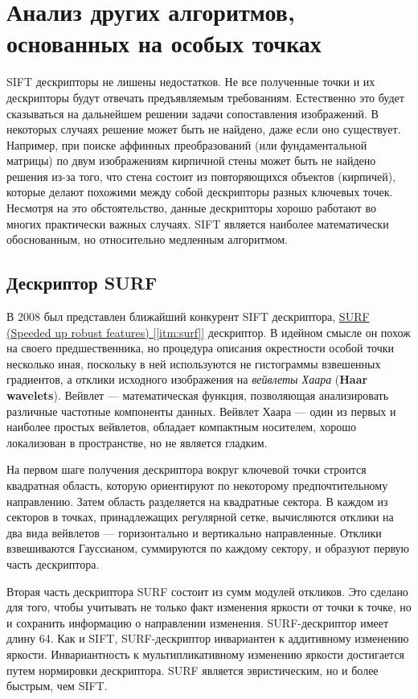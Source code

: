 \section{Анализ других алгоритмов, основанных на особых точках}

SIFT дескрипторы не лишены недостатков. Не все полученные точки и их дескрипторы будут отвечать предъявляемым требованиям. Естественно это будет сказываться на дальнейшем решении задачи сопоставления изображений. В некоторых случаях решение может быть не найдено, даже если оно существует. Например, при поиске аффинных преобразований (или фундаментальной матрицы) по двум изображениям кирпичной стены может быть не найдено решения из-за того, что стена состоит из повторяющихся объектов (кирпичей), которые делают похожими между собой дескрипторы разных ключевых точек. Несмотря на это обстоятельство, данные дескрипторы хорошо работают во многих практически важных случаях. SIFT является наиболее математически обоснованным, но относительно медленным алгоритмом.

\subsection{Дескриптор SURF}

В 2008 был представлен ближайший конкурент SIFT дескриптора, \hyperref[itm:surf]{ SURF (Speeded up robust features) [\ref{itm:surf}]} дескриптор. В идейном смысле он похож на своего предшественника, но процедура описания окрестности особой точки несколько иная, поскольку в ней используются не гистограммы взвешенных градиентов, а отклики исходного изображения на \textit{вейвлеты Хаара} (\textbf{Haar wavelets}). Вейвлет — математическая функция, позволяющая анализировать различные частотные компоненты данных. Вейвлет Хаара — один из первых и наиболее простых вейвлетов, обладает компактным носителем, хорошо локализован в пространстве, но не является гладким.

На первом шаге получения дескриптора вокруг ключевой точки строится квадратная область, которую ориентируют по некоторому предпочтительному направлению. Затем область разделяется на квадратные сектора. В каждом из секторов в точках, принадлежащих регулярной сетке, вычисляются отклики на два вида вейвлетов — горизонтально и вертикально направленные. Отклики взвешиваются Гауссианом, суммируются по каждому сектору, и образуют первую часть дескриптора.

Вторая часть дескриптора SURF состоит из сумм модулей откликов. Это сделано для того, чтобы учитывать не только факт изменения яркости от точки к точке, но и сохранить информацию о направлении изменения. SURF-дескриптор имеет длину 64. Как и SIFT, SURF-дескриптор инвариантен к аддитивному изменению яркости. Инвариантность к мультипликативному изменению яркости достигается путем нормировки дескриптора. SURF является эвристическим, но и более быстрым, чем SIFT.

